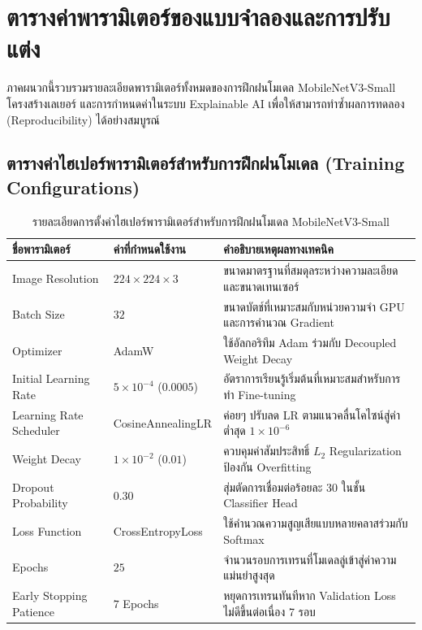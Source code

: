\chapter{ตารางค่าพารามิเตอร์ของแบบจำลองและการปรับแต่ง}
\label{app:hyperparameters}

ภาคผนวกนี้รวบรวมรายละเอียดพารามิเตอร์ทั้งหมดของการฝึกฝนโมเดล MobileNetV3-Small โครงสร้างเลเยอร์ และการกำหนดค่าในระบบ Explainable AI เพื่อให้สามารถทำซ้ำผลการทดลอง (Reproducibility) ได้อย่างสมบูรณ์

\section{ตารางค่าไฮเปอร์พารามิเตอร์สำหรับการฝึกฝนโมเดล (Training Configurations)}

\begin{table}[H]
\caption{รายละเอียดการตั้งค่าไฮเปอร์พารามิเตอร์สำหรับการฝึกฝนโมเดล MobileNetV3-Small}
\label{tab:app_b_hyperparams}
\begin{tabularx}{\textwidth}{L{4.2cm}L{3.2cm}Y}
\toprule
\textbf{ชื่อพารามิเตอร์} & \textbf{ค่าที่กำหนดใช้งาน} & \textbf{คำอธิบายเหตุผลทางเทคนิค} \\
\midrule
Image Resolution & $224 \times 224 \times 3$ & ขนาดมาตรฐานที่สมดุลระหว่างความละเอียดและขนาดเทนเซอร์ \\
Batch Size & $32$ & ขนาดบัตช์ที่เหมาะสมกับหน่วยความจำ GPU และการคำนวณ Gradient \\
Optimizer & AdamW & ใช้อัลกอริทึม Adam ร่วมกับ Decoupled Weight Decay \\
Initial Learning Rate & $5 \times 10^{-4}$ ($0.0005$) & อัตราการเรียนรู้เริ่มต้นที่เหมาะสมสำหรับการทำ Fine-tuning \\
Learning Rate Scheduler & CosineAnnealingLR & ค่อยๆ ปรับลด LR ตามแนวคลื่นโคไซน์สู่ค่าต่ำสุด $1 \times 10^{-6}$ \\
Weight Decay & $1 \times 10^{-2}$ ($0.01$) & ควบคุมค่าสัมประสิทธิ์ $L_2$ Regularization ป้องกัน Overfitting \\
Dropout Probability & $0.30$ & สุ่มตัดการเชื่อมต่อร้อยละ 30 ในชั้น Classifier Head \\
Loss Function & CrossEntropyLoss & ใช้คำนวณความสูญเสียแบบหลายคลาสร่วมกับ Softmax \\
Epochs & $25$ & จำนวนรอบการเทรนที่โมเดลลู่เข้าสู่ค่าความแม่นยำสูงสุด \\
Early Stopping Patience & $7$ Epochs & หยุดการเทรนทันทีหาก Validation Loss ไม่ดีขึ้นต่อเนื่อง 7 รอบ \\
\bottomrule
\end{tabularx}
\end{table}

